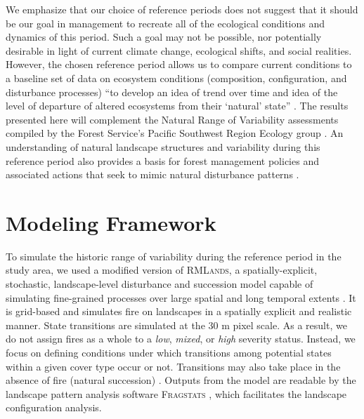 We emphasize that our choice of reference periods does not suggest that it should be our goal in management to recreate all of the ecological conditions and dynamics of this period. Such a goal may not be possible, nor potentially desirable in light of current climate change, ecological shifts, and social realities. However, the chosen reference period allows us to compare current conditions to a baseline set of data on ecosystem conditions (composition, configuration, and disturbance processes) ``to develop an idea of trend over time and idea of the level of departure of altered ecosystems from their `natural' state'' \citep{Safford2013}. The results presented here will complement the Natural Range of Variability assessments compiled by the Forest Service's Pacific Southwest Region Ecology group \citep[e.g.,][]{Safford2013,Merriam2013,Meyer2013a,Meyer2013,Estes2013,Estes2013a,Gross2013}. An understanding of natural landscape structures and variability during this reference period also provides a basis for forest management policies and associated actions that seek to mimic natural disturbance patterns \citep{Romme2000,Buse2002}. 






\section{Modeling Framework}

To simulate the historic range of variability during the reference period in the study area, we used a modified version of \textsc{RMLands}, a spatially-explicit, stochastic, landscape-level disturbance and succession model capable of simulating fine-grained processes over large spatial and long temporal extents \citep{McGarigal2005}. It is grid-based and simulates fire on landscapes in a spatially explicit and realistic manner. State transitions are simulated at the 30 m pixel scale. As a result, we do not assign fires as a whole to a \emph{low}, \emph{mixed}, or \emph{high} severity status. Instead, we focus on defining conditions under which transitions among potential states within a given cover type occur or not. Transitions may also take place in the absence of fire (natural succession) \citep{McGarigal2012}. Outputs from the model are readable by the landscape pattern analysis software \textsc{Fragstats} \citep{Fragstats2012}, which facilitates the landscape configuration analysis.

